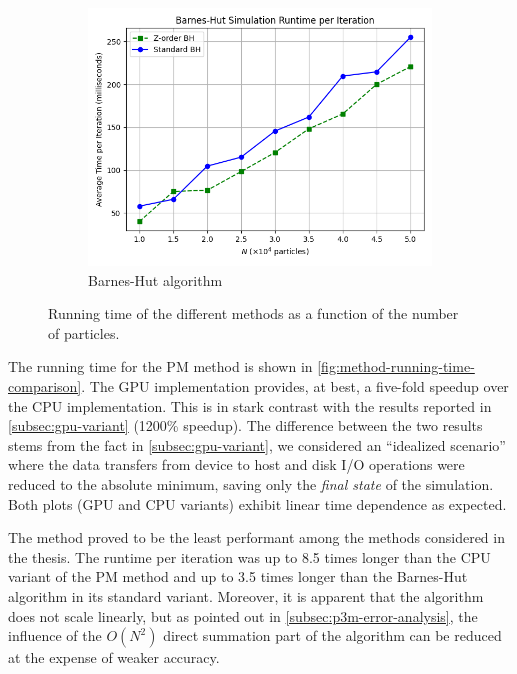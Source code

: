 \begin{figure}[!ht]
    \vspace{1em}

    \begin{subfigure}[b]{0.48\textwidth}
        \centering
        \includegraphics[width=\linewidth]{chapters/results/img/perf/bh_time.png}
        \caption{Barnes-Hut algorithm}
        \label{fig:bh-running-time}
    \end{subfigure}

    \caption{Running time of the different methods as a function of the number of particles.}
    \label{fig:method-running-time-comparison}
\end{figure}

The running time for the PM method is shown in \autoref{fig:method-running-time-comparison}.
The GPU implementation provides, at best, a five-fold speedup over the CPU implementation.
This is in stark contrast with the results reported in \autoref{subsec:gpu-variant} (1200\% speedup).
The difference between the two results stems from the fact in \autoref{subsec:gpu-variant}, we considered an ``idealized scenario'' where the data transfers from device to host and disk I/O operations were reduced to the absolute minimum, saving only the \textit{final state} of the simulation.
Both plots (GPU and CPU variants) exhibit linear time dependence as expected.

The \PThreeM{} method proved to be the least performant among the methods considered in the thesis.
The runtime per iteration was up to 8.5 times longer than the CPU variant of the PM method and up to 3.5 times longer than the Barnes-Hut algorithm in its standard variant.
Moreover, it is apparent that the algorithm does not scale linearly, but as pointed out in \autoref{subsec:p3m-error-analysis}, the influence of the $O(N^2)$ direct summation part of the algorithm can be reduced at the expense of weaker accuracy.

